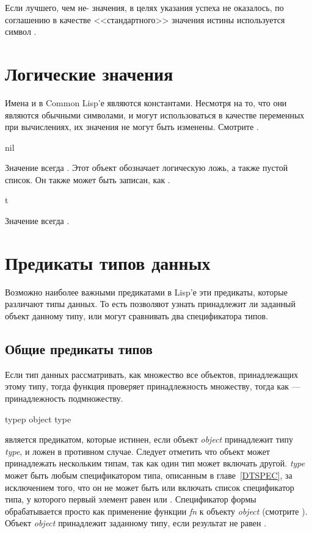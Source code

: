 Если лучшего, чем не-{\nil} значения, в целях указания успеха не оказалось, по
соглашению в качестве <<стандартного>> значения истины используется символ .

\section{Логические значения}

Имена  и  в Common Lisp'е являются константами. Несмотря на то,
что они являются обычными символами, и могут использоваться в качестве переменных
при вычислениях, их значения не могут быть изменены. Смотрите .

\begin{defun}[Константа]
nil

Значение {\nil} всегда {\nil}. Этот объект обозначает логическую ложь, а также
пустой список. Он также может быть записан, как \cd{()}.
\end{defun}

\begin{defun}[Константа]
t

Значение  всегда .
\end{defun}

\section{Предикаты типов данных}

Возможно наиболее важными предикатами в Lisp'е эти предикаты, которые различают
типы данных. То есть позволяют узнать принадлежит ли заданный объект данному 
типу, или могут сравнивать два спецификатора типов.

\subsection{Общие предикаты типов}

Если тип данных рассматривать, как множество все объектов, принадлежащих этому
типу, тогда функция  проверяет принадлежность множеству, тогда как
 --- принадлежность подмножеству.

\begin{defun}[Функция]
typep object type

 является предикатом, которые истинен, если объект \emph{object}
принадлежит типу \emph{type}, и ложен в противном случае.
Следует отметить что объект может принадлежать нескольким типам, так как один
тип может включать другой. \emph{type} может быть любым спецификатором типа,
описанным в главе~\ref{DTSPEC}, за исключением того, что он не может быть или
включать список спецификатор типа, у которого первый элемент равен
 или .
Спецификатор формы  обрабатывается просто как применение
функции \emph{fn} к объекту \emph{object} (смотрите ). Объект
\emph{object} принадлежит заданному типу, если результат не равен {\false}.
\end{defun}

